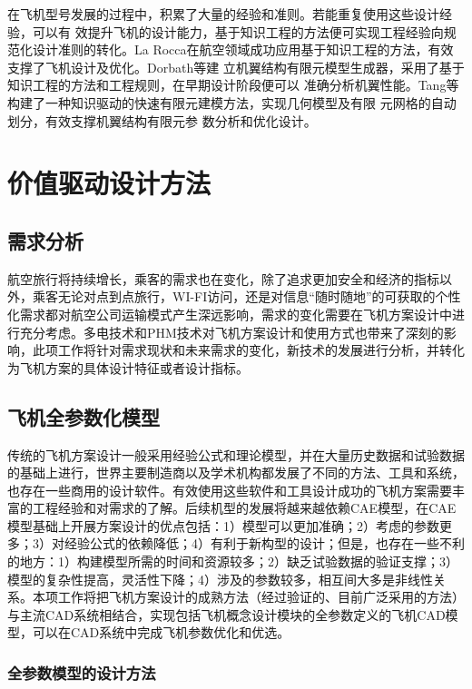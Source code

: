 \documentclass[12pt,a4paper]{report}
\begin{document}
在飞机型号发展的过程中，积累了大量的经验和准则。若能重复使用这些设计经验，可以有 效提升飞机的设计能力，基于知识工程的方法便可实现工程经验向规范化设计准则的转化。La Rocca\cite{larocca2011knowledge}在航空领域成功应用基于知识工程的方法，有效支撑了飞机设计及优化。Dorbath等\cite{dorbath2011aknowledge}建 立机翼结构有限元模型生成器，采用了基于知识工程的方法和工程规则，在早期设计阶段便可以 准确分析机翼性能。Tang等\cite{tang2013finite}构建了一种知识驱动的快速有限元建模方法，实现几何模型及有限 元网格的自动划分，有效支撑机翼结构有限元参 数分析和优化设计。


\chapter{价值驱动设计方法}

\section{需求分析}

航空旅行将持续增长，乘客的需求也在变化，除了追求更加安全和经济的指标以外，乘客无论对点到点旅行，WI-FI访问，还是对信息“随时随地”的可获取的个性化需求都对航空公司运输模式产生深远影响，需求的变化需要在飞机方案设计中进行充分考虑。多电技术和PHM技术对飞机方案设计和使用方式也带来了深刻的影响，此项工作将针对需求现状和未来需求的变化，新技术的发展进行分析，并转化为飞机方案的具体设计特征或者设计指标。


\section{飞机全参数化模型}

传统的飞机方案设计一般采用经验公式和理论模型，并在大量历史数据和试验数据的基础上进行，世界主要制造商以及学术机构都发展了不同的方法、工具和系统，也存在一些商用的设计软件。有效使用这些软件和工具设计成功的飞机方案需要丰富的工程经验和对需求的了解。后续机型的发展将越来越依赖CAE模型，在CAE模型基础上开展方案设计的优点包括：1）模型可以更加准确；2）考虑的参数更多；3）对经验公式的依赖降低；4）有利于新构型的设计；但是，也存在一些不利的地方：1）构建模型所需的时间和资源较多；2）缺乏试验数据的验证支撑；3）模型的复杂性提高，灵活性下降；4）涉及的参数较多，相互间大多是非线性关系。本项工作将把飞机方案设计的成熟方法（经过验证的、目前广泛采用的方法）与主流CAD系统相结合，实现包括飞机概念设计模块的全参数定义的飞机CAD模型，可以在CAD系统中完成飞机参数优化和优选。

\subsection{全参数模型的设计方法}
\end{document}
